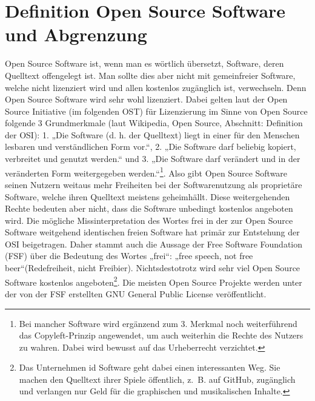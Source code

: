 \documentclass[a4paper,12pt]{article}
\begin{document}
\section{Definition Open Source Software und Abgrenzung}
Open Source Software ist, wenn man es wörtlich übersetzt, Software, deren Quelltext offengelegt ist. Man sollte dies aber nicht mit gemeinfreier Software, welche nicht lizenziert wird und allen kostenlos zugänglich ist, verwechseln. Denn Open Source Software wird sehr wohl lizenziert. Dabei gelten laut der Open Source Initiative (im folgenden OST) für Lizenzierung im Sinne von Open Source folgende 3 Grundmerkmale (laut Wikipedia, Open Source, Abschnitt: Definition der OSI): 1. „Die Software (d. h. der Quelltext) liegt in einer für den Menschen lesbaren und verständlichen Form vor.“, 2. „Die Software darf beliebig kopiert, verbreitet und genutzt werden.“ und 3. „Die Software darf verändert und in der veränderten Form weitergegeben werden.“\footnote{Bei mancher Software wird ergänzend zum 3. Merkmal noch weiterführend das Copyleft-Prinzip angewendet, um auch weiterhin die Rechte des Nutzers zu wahren. Dabei wird bewusst auf das Urheberrecht verzichtet.}. Also gibt Open Source Software seinen Nutzern weitaus mehr Freiheiten bei der Softwarenutzung als proprietäre Software, welche ihren Quelltext meistens geheimhällt. Diese weitergehenden Rechte bedeuten aber nicht, dass die Software unbedingt kostenlos angeboten wird. Die mögliche Missinterpretation des Wortes frei in der zur Open Source Software weitgehend identischen freien Software hat primär zur Entstehung der OSI beigetragen. Daher stammt auch die Aussage der Free Software Foundation (FSF) über die Bedeutung des Wortes „frei“: „free speech, not free beer“(Redefreiheit, nicht Freibier). Nichtsdestotrotz wird sehr viel Open Source Software kostenlos angeboten\footnote{Das Unternehmen id Software geht dabei einen interessanten Weg. Sie machen den Quelltext ihrer Spiele öffentlich, z.~B. auf GitHub, zugänglich und verlangen nur Geld für die graphischen und musikalischen Inhalte.}. Die meisten Open Source Projekte werden unter der von der FSF erstellten GNU General Public License veröffentlicht.\\
\end{document}
